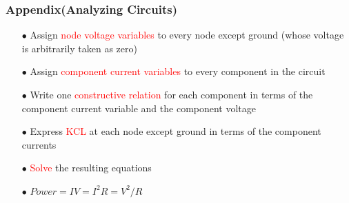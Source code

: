 \documentclass{beamer}
\newcommand{\red}[1]{\textcolor{red}{#1}}
\begin{document}
\begin{frame}
\frametitle{Appendix(Analyzing Circuits)}
\begin{itemize} \itemsep1pt \parskip0pt 
  	\item[$\bullet$] Assign \red{node voltage variables} to every node except ground (whose voltage is arbitrarily taken as zero)
  	\item[$\bullet$] Assign \red{component current variables} to every component in the circuit
  	\item[$\bullet$] Write one \red{constructive relation} for each component in terms of the component current variable and the component voltage
  	\item[$\bullet$] Express \red{KCL} at each node except ground in terms of the component currents
  	\item[$\bullet$] \red{Solve} the resulting equations
	\item[$\bullet$] $Power = IV = I^2R = V^2/R$
\end{itemize}
\end{frame}
\end{document}
